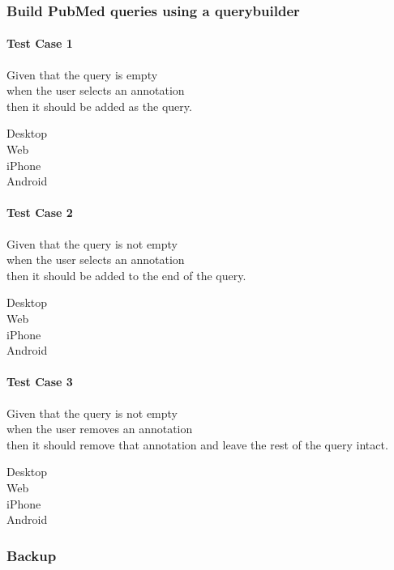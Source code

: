 \subsubsection{Build PubMed queries using a querybuilder}
\paragraph*{Test Case 1}
Given that the query is empty \\ when the user selects an annotation \\ then it should be added as the query.
\begin{description}
 \item[Desktop]
 \item[Web] \cmark
  \item[iPhone] \cmark
 \item[Android] 
\end{description}
\paragraph*{Test Case 2}
Given that the query is not empty \\ when the user selects an annotation \\ then it should be added to the end of the query.
\begin{description}
 \item[Desktop]
 \item[Web] \cmark
  \item[iPhone] \xmark
 \item[Android]
\end{description}
\paragraph*{Test Case 3}
Given that the query is not empty \\ when the user removes an annotation \\ then it should remove that annotation and leave the rest of the query intact.
\begin{description}
 \item[Desktop]
 \item[Web] 
  \item[iPhone] \cmark
 \item[Android]
\end{description}

\subsubsection{Backup}
